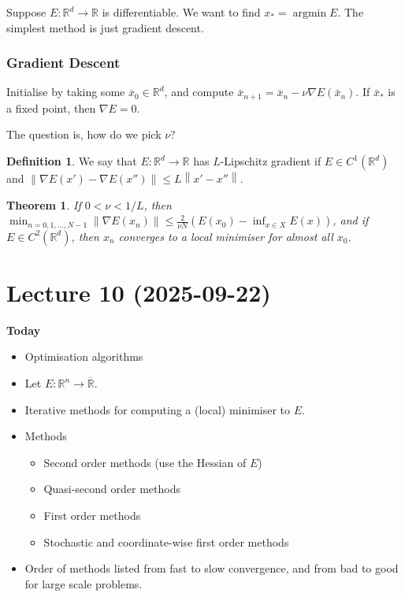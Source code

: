 \documentclass[12pt]{article}
\newtheorem{theorem}{Theorem}[section]
\theoremstyle{definition}
\newtheorem{definition}{Definition}[section]
\newcommand{\real}{\mathbb{R}}   %
\DeclareMathOperator{\argmin}{argmin}
\newcommand\norm[1]{\left\lVert#1\right\rVert}
\begin{document}
Suppose $E:\real^d\to\real$ is differentiable. We want to find $x_*=\argmin E$. The simplest method is just gradient descent.

\subsubsection{Gradient Descent}
Initialise by taking some $\overline{x}_0\in \real^d$, and compute $\bar{x}_{n+1} = \bar{x}_n - \nu \nabla E(\bar{x}_n)$. If $\bar{x}_*$ is a fixed point, then $\nabla E = 0$. 

The question is, how do we pick $\nu$?

\begin{definition}
    We say that $E:\real^d\to \real$ has $L$-Lipschitz gradient if $E\in C^1(\real^d)$ and $\norm{\nabla E(x') - \nabla E(x'')}\leq L\norm{x'-x''}$.
\end{definition}

\begin{theorem}
    If $0<\nu<1/L$, then $\min_{n=0,1,\dots,N-1} \norm{\nabla E(x_n)}\leq \frac{2}{\nu N}(E(x_0)-\inf_{x\in X} E(x))$, and if $E\in C^2(\real^d)$, then $x_n$ converges to a local minimiser for almost all $x_0$.
\end{theorem}

\newpage

\section{Lecture 10 (2025-09-22)}

\textbf{Today}
\begin{itemize}
    \item Optimisation algorithms
\end{itemize}

\begin{itemize}
    \item Let $E:\real^n\to\overline{\real}$. 
    \item Iterative methods for computing a (local) minimiser to $E$.
    \item Methods
    \begin{itemize}
        \item Second order methods (use the Hessian of $E$)
        \item Quasi-second order methods
        \item First order methods
        \item Stochastic and coordinate-wise first order methods
    \end{itemize}
    \item Order of methods listed from fast to slow convergence, and from bad to good for large scale problems.
\end{itemize}
\end{document}
